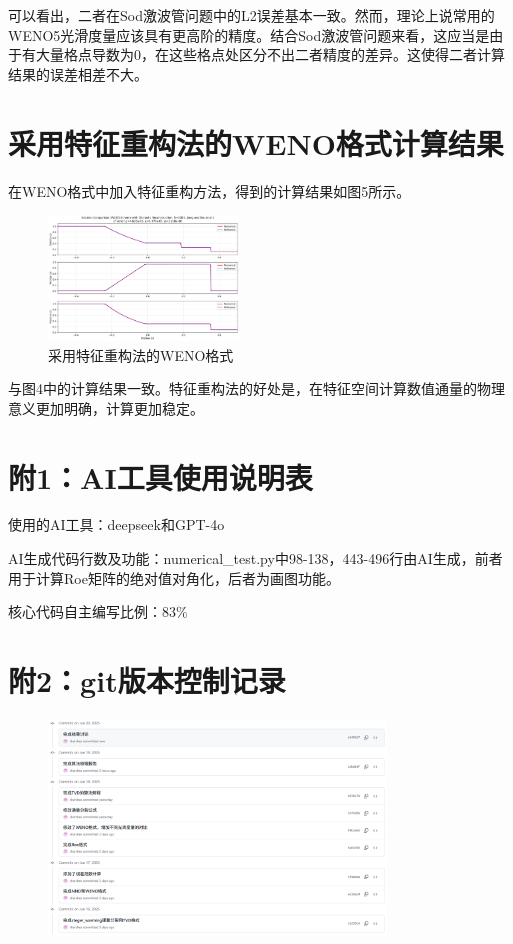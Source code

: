 \documentclass[12pt, a4paper]{article}
\begin{document}
可以看出，二者在Sod激波管问题中的L2误差基本一致。然而，理论上说常用的WENO5光滑度量应该具有更高阶的精度。结合Sod激波管问题来看，这应当是由于有大量格点导数为0，在这些格点处区分不出二者精度的差异。这使得二者计算结果的误差相差不大。

\section{采用特征重构法的WENO格式计算结果}
在WENO格式中加入特征重构方法，得到的计算结果如图5所示。
\begin{figure}[htbp]
    \centering
    \includegraphics[width=0.45\textwidth]{./pictures/Solution Comparison (WENO Scheme with Charastic Reconstruction, N=1001, Jiang and Shu et al.).png} 
    \caption{采用特征重构法的WENO格式}
\end{figure}
与图4中的计算结果一致。特征重构法的好处是，在特征空间计算数值通量的物理意义更加明确，计算更加稳定。

\section*{附1：AI工具使用说明表}
使用的AI工具：deepseek和GPT-4o

AI生成代码行数及功能：numerical\_test.py中98-138，443-496行由AI生成，前者用于计算Roe矩阵的绝对值对角化，后者为画图功能。

核心代码自主编写比例：83\%

\section*{附2：git版本控制记录}
\begin{figure}[htbp]
    \includegraphics[width=0.8\textwidth]{./pictures/git_control.png}
\end{figure}
\end{document}
